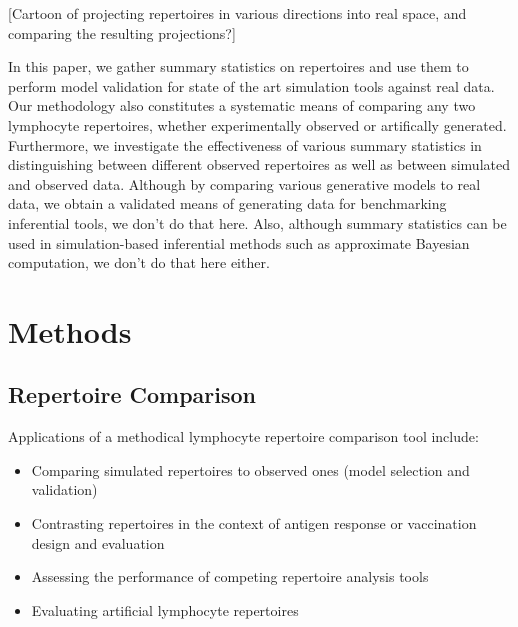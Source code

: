 \documentclass{article}
\begin{document}
[Cartoon of projecting repertoires in various directions into real space, and comparing the resulting projections?]

In this paper, we gather summary statistics on repertoires and use them to perform model validation for state of the art simulation tools against real data.
Our methodology also constitutes a systematic means of comparing any two lymphocyte repertoires, whether experimentally observed or artifically generated.
Furthermore, we investigate the effectiveness of various summary statistics in distinguishing between different observed repertoires as well as between simulated and observed data.
Although by comparing various generative models to real data, we obtain a validated means of generating data for benchmarking inferential tools, we don't do that here.
Also, although summary statistics can be used in simulation-based inferential methods such as approximate Bayesian computation, we don't do that here either.


\section*{Methods}

\subsection*{Repertoire Comparison}

Applications of a methodical lymphocyte repertoire comparison tool include:
\begin{itemize}
\item Comparing simulated repertoires to observed ones (model selection and validation)
\item Contrasting repertoires in the context of antigen response or vaccination design and evaluation
\item Assessing the performance of competing repertoire analysis tools
\item Evaluating artificial lymphocyte repertoires \cite{Finlay2012}
\end{itemize}
\end{document}
